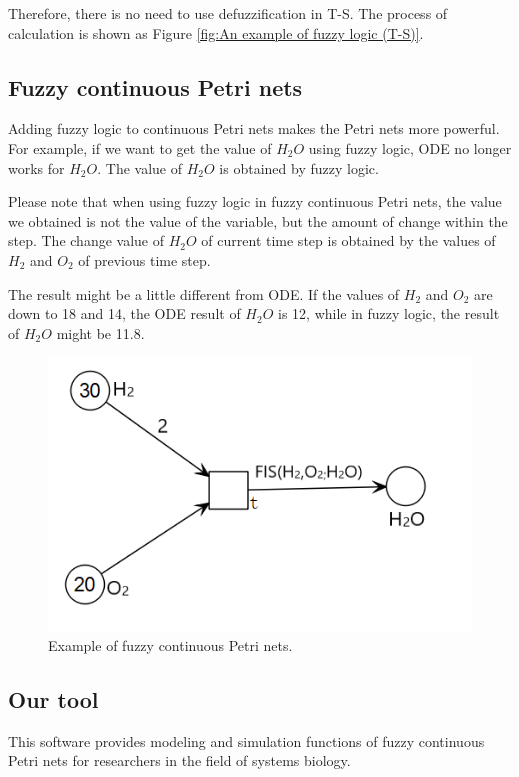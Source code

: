 \documentclass[journal,a4paper,onecolumn]{article}
\newcommand{\comR}[1]{\textcolor{red}{\emph{#1}}}
\newcommand{\comB}[1]{\textcolor{blue}{\emph{#1}}}
\begin{document}
Therefore, there is no need to use defuzzification in T-S. The process of calculation is shown as Figure \ref{fig:An example of fuzzy logic (T-S)}.




\subsection{Fuzzy continuous Petri nets}
Adding fuzzy logic to continuous Petri nets makes the Petri nets more powerful. For example, if we want to get the value of $H_2O$ using fuzzy logic, ODE no longer works for $H_2O$. The value of $H_2O$ is obtained by fuzzy logic. 

Please note that when using fuzzy logic in fuzzy continuous Petri nets, the value we obtained is not the value of the variable, but the amount of change within the step. The change value of $H_2O$ of current time step is obtained by the values of $H_2$ and $O_2$ of previous time step. 

The result might be a little different from ODE. If the values of $H_2$ and $O_2$ are down to 18 and 14, the ODE result of $H_2O$ is 12, while in fuzzy logic, the result of $H_2O$ might be 11.8. 
\begin{figure}[!hbt]
	\begin{center}
		\includegraphics[width=0.5\columnwidth]{fig50}
		\caption{Example of fuzzy continuous Petri nets.}
		\label{fig:Example of fuzzy continuous Petri nets}
	\end{center}
\end{figure}



\subsection{Our tool}

This software provides modeling and simulation functions of fuzzy continuous Petri nets for researchers in the field of systems biology.
\end{document}
